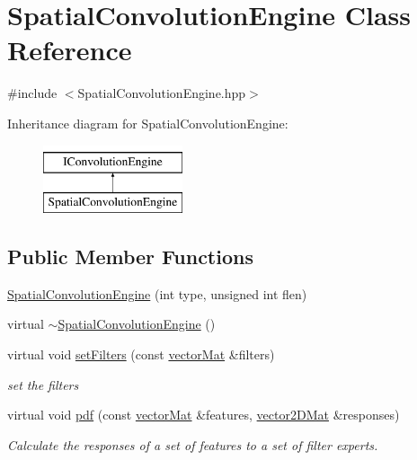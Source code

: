 \hypertarget{classSpatialConvolutionEngine}{\section{Spatial\-Convolution\-Engine Class Reference}
\label{classSpatialConvolutionEngine}
}


{\ttfamily \#include $<$Spatial\-Convolution\-Engine.\-hpp$>$}

Inheritance diagram for Spatial\-Convolution\-Engine\-:\begin{figure}[H]
\begin{center}
\leavevmode
\includegraphics[height=2.000000cm]{classSpatialConvolutionEngine}
\end{center}
\end{figure}
\subsection*{Public Member Functions}
\begin{DoxyCompactItemize}
\item 
\hyperlink{classSpatialConvolutionEngine_a9efb2b7de50aaf86ad6bcb56a953d447}{Spatial\-Convolution\-Engine} (int type, unsigned int flen)
\item 
virtual \hyperlink{classSpatialConvolutionEngine_a07b28be0c28a1c47bc6f2a7459155802}{$\sim$\-Spatial\-Convolution\-Engine} ()
\item 
virtual void \hyperlink{classSpatialConvolutionEngine_ad27aad7b65dfa3ec6a617eed96c01d9c}{set\-Filters} (const \hyperlink{types_8hpp_a3207a7addcfa415d1c83622febcb1e9b}{vector\-Mat} \&filters)
\begin{DoxyCompactList}\small\item\em set the filters \end{DoxyCompactList}\item 
virtual void \hyperlink{classSpatialConvolutionEngine_a6db3b5e9428ee74e1b4e9e7f7111cad5}{pdf} (const \hyperlink{types_8hpp_a3207a7addcfa415d1c83622febcb1e9b}{vector\-Mat} \&features, \hyperlink{types_8hpp_a33cacb85be7b8df3dc0b67d5d849f4cc}{vector2\-D\-Mat} \&responses)
\begin{DoxyCompactList}\small\item\em Calculate the responses of a set of features to a set of filter experts. \end{DoxyCompactList}\end{DoxyCompactItemize}
